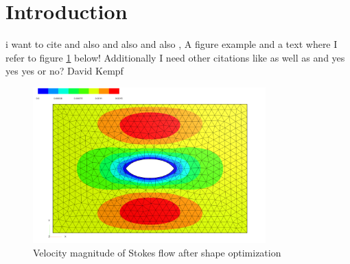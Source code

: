 \section{Introduction}


i want to cite \cite{fully_semi_paper_sturm}
and also \cite{vol_bary_constraint_paper} and also \cite{lecture_notes_sturm} and also \cite{nearly_conformal_paper}, 
A figure example and a text where I refer to figure \ref{shape_opt_plot} below! Additionally I need other citations like \cite{lecture_notes_faustmann_numPDE}
as well as \cite{lecture_notes_faustmann_AMF} and \cite{lecture_notes_melenk_numcomp}
yes yes yes or no? David Kempf
\begin{figure}[ht]
    \centering
    \includegraphics[width=0.8\textwidth]{figures/solution_shape_opt.PNG}
	\caption{Velocity magnitude of Stokes flow after shape optimization}
	\label{shape_opt_plot}
\end{figure}